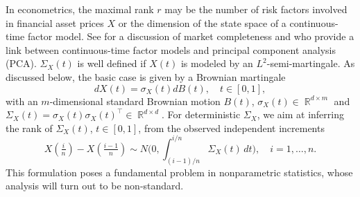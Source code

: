 \documentclass[preprint,aos]{imsart}
\numberwithin{equation}{section}
\theoremstyle{remark}
\DeclareMathOperator{\R}{{\mathbb R}}
\begin{document}
In econometrics, the maximal rank $r$ may be the number of risk factors involved in financial asset prices $X$ or the dimension of the state space of a continuous-time factor model. See \citet{jacod2013} for a discussion of market completeness and \citet{ait2017} who provide a link between continuous-time factor models and principal component analysis (PCA). $\Sigma_X(t)$ is well defined if $X(t)$ is modeled by an $L^2$-semi-martingale.  As discussed below,
the basic case is given by a Brownian martingale
\begin{equation}\label{EqX}
 dX(t)=\sigma_X(t)dB(t),\quad t\in[0,1],
 \end{equation}
with an $m$-dimensional standard Brownian motion $B(t)$, $\sigma_X(t)\in\R^{d\times m}$ and  $\Sigma_X(t)=\sigma_X(t)\sigma_X(t)^\top\in\R^{d\times d}$. For deterministic $\Sigma_X$, we aim at inferring the rank of $\Sigma_X(t)$, $t\in [0,1]$, from the observed independent increments
\begin{equation}\label{EqXincr}
X(\tfrac in)-X(\tfrac{i-1}n)\sim N\Big(0,\int_{(i-1)/n}^{i/n}\Sigma_X(t)\,dt\Big),\quad i=1,\ldots,n.
\end{equation}
This formulation poses a fundamental problem in nonparametric statistics, whose analysis will turn out to be non-standard.
\end{document}
